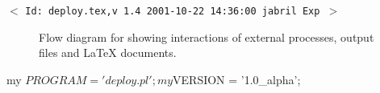 \documentclass[11pt]{article}
\def\nwendcode{\endtrivlist \endgroup} %
\let\nwdocspar=\par                    %
\begin{document}
\nwenddocs{}%
\nwdocspar
\nwenddocs{}%
\nwdocspar
\nwenddocs{}%
\nwdocspar

\newpage %
\setcounter{page}{1}
\pagestyle{fancy}
\renewcommand{\sectionmark}[1]{\markboth{}{\thesection.\ #1}}
\renewcommand{\subsectionmark}[1]{\markboth{}{\thesubsection.\ \textsl{#1}}}

\tableofcontents
\listoftables
\listoffigures

\vfill
\begin{center}
{\small$<$ \verb$Id: deploy.tex,v 1.4 2001-10-22 14:36:00 jabril Exp $$>$ }
\end{center}


\newpage %
\setcounter{page}{1}


\label{todo:IAA}
\nwenddocs{}%
%
%
\nwdocspar
\nwenddocs{}%
%
\nwdocspar
\todo{ \item \todoIAA } %
\begin{figure}[!ht]
\begin{center}
\fbox{\parbox[c][8cm][c]{\linewidth}{\hfill}}
\caption[Flow diagram for \progname.]{\label{fig:flowdiag} Flow diagram for {\progname} showing interactions of external processes, output files and {\LaTeX} documents.}
\end{center}
\end{figure}
 



\begin{itemize}
 
\end{itemize}

\newpage %


\nwenddocs{}\endmoddef
my $PROGRAM = 'deploy.pl';
my $VERSION = '1.0_alpha';
\nwendcode{}\nwdocspar
\end{document}
